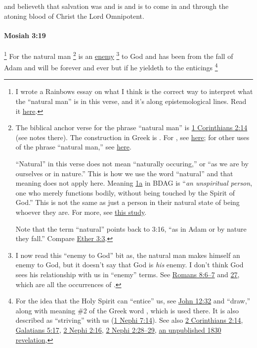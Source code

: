 			and believeth that salvation was and is and is to come
			in and through the atoning blood of Christ the Lord Omnipotent.

		\paragraph{Mosiah 3:19} %
			\label{MOSIAH-3-19}

				\footnote{%
					I wrote a Rainbows essay on what I think is the correct way to interpret what the ``natural man'' is in this verse, and it's along epistemological lines. Read it \href{https://climbingtherainbows.substack.com/p/knowledge-and-the-natural-man}{here}.
					}%
			For the natural man%
				\footnote{%
					The biblical anchor verse for the phrase ``natural man'' is \hyperref[1CORINTHIANS-2-14]{1 Corinthians 2:14} (see notes there). The construction in Greek is . For , see \hyperref[PSUCHIKOS]{here}; for other uses of the phrase ``natural man,'' see \hyperref[NATURAL-PHRASES]{here}.
					
					``Natural'' in this verse does not mean ``naturally occuring,'' or ``as we are by ourselves or in nature.'' This is how we use the word ``natural'' and that meaning does not apply here. Meaning \hyperref[PSUCHIKOS]{1a} in BDAG is ``\textit{an unspiritual person}, one who merely functions bodily, without being touched by the Spirit of God.'' This is not the same as just a person in their natural state of being whoever they are. For more, see \hyperref[NATURAL-man]{this study}.
					
					Note that the term ``natural'' points back to 3:16, ``as in Adam or by nature they fall.'' Compare \hyperref[ETHER-3-3]{Ether 3:3}.
					}
			is an \hyperref[ENEMY-1828]{enemy}%
				\footnote{%
					I now read this ``enemy to God'' bit as, the natural man makes himself an enemy to God, but it doesn't say that God is \textit{his} enemy. I don't think God sees his relationship with us in ``enemy'' terms. See \hyperref[ROMANS-8-6]{Romans 8:6--7} and \hyperref[ROMANS-8-27]{27}, which are all the occurrences of .
					}
			to God
			and has been from the fall of Adam and will be forever and ever
			but if he yieldeth to the enticings%
				\footnote{%
					For the idea that the Holy Spirit can ``entice'' us, see \hyperref[JOHN-12-32]{John 12:32} and ``draw,'' along with meaning \#2 of the Greek word , which is used there. It is also described as ``striving'' with us (\hyperref[1NEPHI-7-14]{1 Nephi 7:14}). See also \hyperref[2CORINTHIANS-2-14]{2 Corinthians 2:14}, \hyperref[GALATIANS-5-17]{Galatians 5:17}, \hyperref[2NEPHI-2-16]{2 Nephi 2:16}, \hyperref[2NEPHI-2-28]{2 Nephi 2:28--29}, \hyperlink{EMS-1830-JS-CIR-EARLY-1830-d}{an unpublished 1830 revelation}, 
					}
